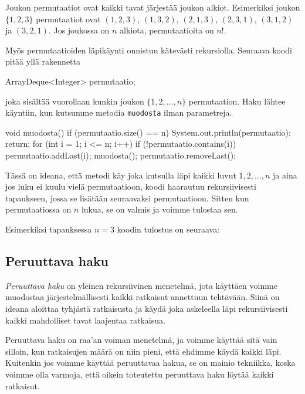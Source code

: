 Joukon permutaatiot ovat kaikki tavat järjestää joukon alkiot.
Esimerkiksi joukon $\{1,2,3\}$ permutaatiot ovat
$(1,2,3)$, $(1,3,2)$, $(2,1,3)$, $(2,3,1)$, $(3,1,2)$ ja $(3,2,1)$.
Jos joukossa on $n$ alkiota, permutaatioita on $n!$.

Myös permutaatioiden läpikäynti onnistuu kätevästi rekursiolla.
Seuraava koodi pitää yllä rakennetta

\begin{code}
ArrayDeque<Integer> permutaatio;
\end{code}

joka sisältää vuorollaan kunkin joukon $\{1,2,\dots,n\}$ permutaation.
Haku lähtee käyntiin, kun kutsumme metodia
\texttt{muodosta} ilman parametreja.

\begin{code}
void muodosta() {
    if (permutaatio.size() == n) {
        System.out.println(permutaatio);
        return;
    }
    for (int i = 1; i <= n; i++) {
        if (!permutaatio.contains(i)) {
            permutaatio.addLast(i);
            muodosta();
            permutaatio.removeLast();
        }
    }
}
\end{code}

Tässä on ideana, että metodi käy joka kutsulla läpi kaikki luvut
$1,2,\dots,n$ ja aina jos luku ei kuulu vielä permutaatioon,
koodi haarautuu rekursiivisesti tapaukseen, jossa se lisätään
seuraavaksi permutaatioon.
Sitten kun permutaatiossa on $n$ lukua, se on valmis ja
voimme tulostaa sen.

Esimerkiksi tapauksessa $n=3$ koodin tulostus on seuraava:

\begin{code}
[1, 2, 3]
[1, 3, 2]
[2, 1, 3]
[2, 3, 1]
[3, 1, 2]
[3, 2, 1]
\end{code}

\subsection{Peruuttava haku}

\emph{Peruuttava haku} on yleinen rekursiivinen menetelmä,
jota käyttäen voimme muodostaa järjestelmällisesti
kaikki ratkaisut annettuun tehtävään.
Siinä on ideana aloittaa tyhjästä ratkaisusta ja käydä
joka askeleella läpi rekursiivisesti kaikki mahdolliset tavat laajentaa ratkaisua.

Peruuttava haku on raa'an voiman menetelmä,
ja voimme käyttää sitä vain silloin,
kun ratkaisujen määrä on niin pieni,
että ehdimme käydä kaikki läpi.
Kuitenkin jos voimme käyttää peruuttavaa hakua,
se on mainio tekniikka,
koska voimme olla varmoja, että oikein toteutettu
peruuttava haku löytää kaikki ratkaisut.

